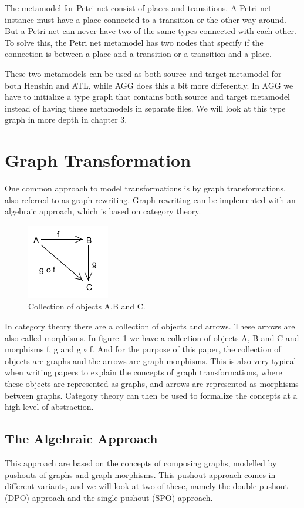 \documentclass[pdftex,11pt,a4paper]{article}
\begin{document}
The metamodel for Petri net consist of places and transitions. A Petri net
instance must have a place connected to a transition or the other way around.
But a Petri net can never have two of the same types connected with each other.
To solve this, the Petri net metamodel has two nodes that specify if the
connection is between a place and a transition or a transition and a place.

These two metamodels can be used as both source and target metamodel for both
Henshin and ATL, while AGG does this a bit more differently. In AGG we have to
initialize a type graph that contains both source and target metamodel instead
of having these metamodels in separate files. We will look at this type graph
in more depth in chapter 3.

\section{Graph Transformation}
\noindent One common approach to model transformations is by graph
transformations, also referred to as graph rewriting. Graph rewriting can be
implemented with an algebraic approach, which is based on category
theory\cite{Barr1990}.

\begin{figure}[H]
	\centering
	\includegraphics[scale=0.7]{figures/categoryTheory.png}
	\caption{Collection of objects A,B and C.}
	\label{fig:categoryTheory}
\end{figure}


In category theory there are a collection of objects and arrows. These arrows
are also called morphisms. In figure~\ref{fig:categoryTheory} we have a
collection of objects A, B and C and morphisms f, g and g $\circ$ f. And for the
purpose of this paper, the collection of objects are graphs and the arrows are
graph morphisms. This is also very typical when writing papers to explain the
concepts of graph transformations, where these objects are represented as
graphs, and arrows are represented as morphisms between graphs. Category theory
can then be used to formalize the concepts at a high level of abstraction.

\subsection{The Algebraic Approach}
\noindent This approach are based on the concepts of composing graphs, modelled
by pushouts of graphs and graph morphisms. This pushout approach comes in
different variants, and we will look at two of these, namely the
double-pushout (DPO) approach and the single pushout (SPO)
approach\cite{Loewe1997,Ehrig1997}.
\end{document}
